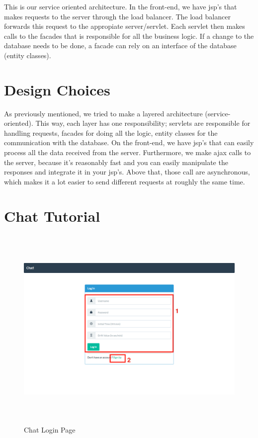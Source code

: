 \documentclass[11pt]{article}
\begin{document}
This is our service oriented architecture. In the front-end, we have jsp's that makes requests to the server through the load balancer. The load balancer forwards this request to the appropiate server/servlet. Each servlet then makes calls to the facades that is responsible for all the business logic. If a change to the database needs to be done, a facade can rely on an interface of the database (entity classes).

\section{Design Choices}

As previously mentioned, we tried to make a layered architecture (service-oriented). This way, each layer has one responsibility; servlets are responsible for handling requests, facades for doing all the logic, entity classes for the communication with the database. On the front-end, we have jsp's that can easily process all the data received from the server. Furthermore, we make ajax calls to the server, because it's reasonably fast and you can easily manipulate the responses and integrate it in your jsp's. Above that, those call are asynchronous, which makes it a lot easier to send different requests at roughly the same time.

\section{Chat Tutorial}

\begin{figure}[H]
\centering
\includegraphics[height=100mm]{login.png}
\caption{Chat Login Page}
\end{figure}
\end{document}
